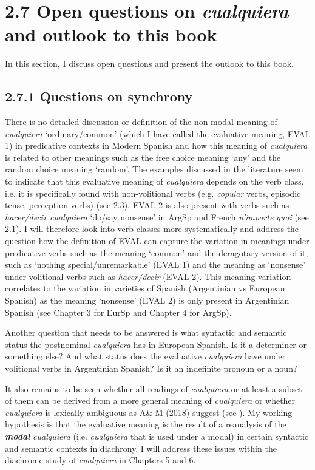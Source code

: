 \section{\textbf{2.7} \textbf{Open} \textbf{questions} \textbf{on} \textbf{\textit{cualquiera}}\textbf{ }\textbf{and} \textbf{outlook} \textbf{to} \textbf{this} \textbf{book}}

 In this section, I discuss open questions and present the outlook to this book.

\subsection{\textbf{2.7.1} \textbf{Questions} \textbf{on} \textbf{synchrony}}

There is no detailed discussion or definition of the non-modal meaning of \textit{cualquiera} ‘ordinary/common’ (which I have called the evaluative meaning, EVAL 1) in predicative contexts in Modern Spanish and how this meaning of \textit{cualquiera} is related to other meanings such as the free choice meaning ‘any’ and the random choice meaning ‘random’. The examples discussed in the literature seem to indicate that this evaluative meaning of \textit{cualquiera} depends on the verb class, i.e. it is specifically found with non-volitional verbs (e.g. \textit{copular} verbs, episodic tense, perception verbs) (see 2.3). EVAL 2 is also present with verbs such as \textit{hacer/decir cualquiera} ‘do/say nonsense’ in ArgSp and French \textit{n’importe quoi} (see 2.1). I will therefore look into verb classes more systematically and address the question how the definition of EVAL can capture the variation in meanings under predicative verbs such as the meaning ‘common’ and the deragotary version of it, such as ‘nothing special/unremarkable’ (EVAL 1) and the meaning as ‘nonsense’ under volitional verbs such as \textit{hacer/decir} (EVAL 2). This meaning variation correlates to the variation in varieties of Spanish (Argentinian vs European Spanish) as the meaning ‘nonsense’ (EVAL 2) is only present in Argentinian Spanish (see Chapter 3 for EurSp and Chapter 4 for ArgSp). 

  Another question that needs to be answered is what syntactic and semantic status the postnominal \textit{cualquiera} has in European Spanish. Is it a determiner or something else? And what status does the evaluative \textit{cualquiera} have under volitional verbs in Argentinian Spanish? Is it an indefinite pronoun or a noun?

  It also remains to be seen whether all readings of \textit{cualquiera} or at least a subset of them can be derived from a more general meaning of \textit{cualquiera} or whether \textit{cualquiera} is lexically ambiguous as A\& M (2018) suggest (see ). My working hypothesis is that the evaluative meaning is the result of a reanalysis of the \textbf{\textit{modal}} \textit{cualquiera} (i.e. \textit{cualquiera} that is used under a modal) in certain syntactic and semantic contexts in diachrony. I will address these issues within the diachronic study of \textit{cualquiera} in Chapters 5 and 6.

